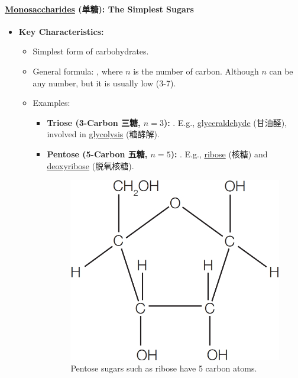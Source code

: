 \paragraph{\underline{Monosaccharides} (单糖): The Simplest Sugars}
\begin{itemize}
    \item \textbf{Key Characteristics:}
    \begin{itemize}
        \item Simplest form of carbohydrates.
        \item General formula: , where $n$ is the number of carbon. Although $n$ can be any number, but it
        is usually low (3-7).
        \item Examples:
        \begin{itemize}
            \item \textbf{Triose (3-Carbon 三糖, $n=3$):} . E.g., \underline{glyceraldehyde} (甘油醛), involved in
            \underline{glycolysis} (糖酵解).
            \item \textbf{Pentose (5-Carbon 五糖, $n=5$):} . E.g., \underline{ribose} (核糖) and
            \underline{deoxyribose} (脱氧核糖).
            \begin{figure}[H]
                \centering
                \includegraphics[scale=0.25]{Biology/1A/Images/1A-2-2.png}
                \caption{Pentose sugars such as ribose have 5 carbon atoms.}
            \end{figure}

\end{itemize}
\end{itemize}
\end{itemize}
